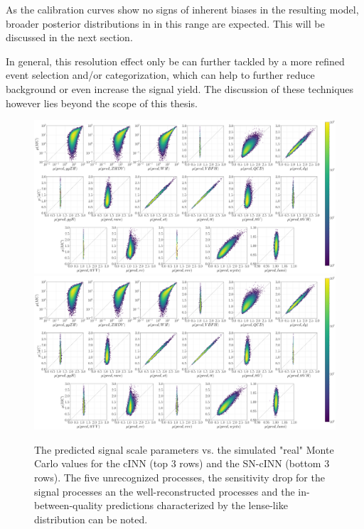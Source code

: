 As the calibration curves show no signs of inherent biases in the resulting model, broader posterior distributions in in this range are expected. This will be discussed in the next section.

In general, this resolution effect only be can further tackled by a more refined event selection and/or categorization, which can help to further reduce background or even increase the signal yield. The discussion of these techniques however lies beyond the scope of this thesis.

\begin{figure}[h!]
	\centering
	\includegraphics[width=\linewidth]{figures/inference/p}
	\includegraphics[width=\linewidth]{figures/inference/p_SN}
	\caption{The predicted signal scale parameters vs. the simulated "real" Monte Carlo values for the cINN (top 3 rows) and the SN-cINN (bottom 3 rows). The five unrecognized processes, the sensitivity drop for the signal processes an the well-reconstructed processes and the in-between-quality predictions characterized by the lense-like distribution can be noted.}
	\label{fig:predictions}
\end{figure}

